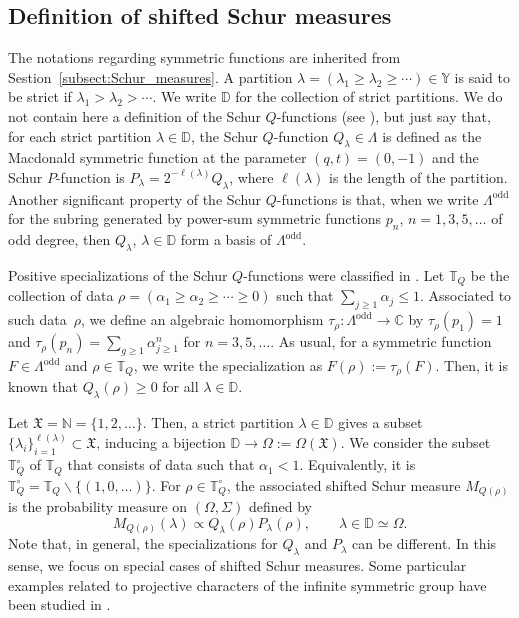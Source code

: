 \documentclass[pdftex]{sigma}
\numberwithin{equation}{section}
\newcommand{\mfrak}[1]{\mathfrak{#1}}
\newcommand{\mbb}[1]{\mathbb{#1}}
\newcommand{\mrm}[1]{\mathrm{#1}}
\begin{document}
\subsection{Definition of shifted Schur measures}
The notations regarding symmetric functions are inherited from Sestion~\ref{subsect:Schur_measures}.
A partition $\lambda=(\lambda_{1}\ge\lambda_{2}\ge\cdots)\in\mbb{Y}$ is said to be strict if $\lambda_{1}>\lambda_{2}>\cdots$.
We write $\mbb{D}$ for the collection of strict partitions. We do not contain here a definition of the Schur $Q$-functions (see \cite[Chapter~III, Section~8]{Macdonald1999}), but just say that, for each strict partition $\lambda\in \mbb{D}$, the Schur $Q$-function $Q_{\lambda}\in\Lambda$ is defined as the Macdonald symmetric function at the parameter $(q,t)=(0,-1)$ and the Schur $P$-function is $P_{\lambda}=2^{-\ell(\lambda)}Q_{\lambda}$, where $\ell(\lambda)$ is the length of the partition. Another significant property of the Schur $Q$-functions is that, when we write $\Lambda^{\mrm{odd}}$ for the subring generated by power-sum symmetric functions $p_{n}$, $n=1,3,5,\dots$ of odd degree, then $Q_{\lambda}$, $\lambda\in\mbb{D}$ form a basis of $\Lambda^{\mrm{odd}}$.

Positive specializations of the Schur $Q$-functions were classified in \cite{Ivanov1999, Nazarov1988}. Let $\mbb{T}_{Q}$ be the collection of data $\rho=(\alpha_{1}\ge \alpha_{2}\ge\cdots \ge 0)$ such that $\sum_{j\ge 1}\alpha_{j}\le 1$. Associated to such data~$\rho$, we define an algebraic homomorphism $\tau_{\rho}\colon \Lambda^{\mrm{odd}}\to\mbb{C}$ by $\tau_{\rho}(p_{1})=1$ and $\tau_{\rho}(p_{n})=\sum_{g\ge 1}\alpha_{j\ge 1}^{n}$ for $n=3,5,\dots$. As usual, for a symmetric function $F\in \Lambda^{\mrm{odd}}$ and $\rho\in \mbb{T}_{Q}$, we write the specialization as $F(\rho):=\tau_{\rho}(F)$. Then, it is known that $Q_{\lambda}(\rho)\ge 0$ for all $\lambda\in\mbb{D}$.

Let $\mfrak{X}=\mbb{N}=\{1,2,\dots\}$. Then, a strict partition $\lambda\in\mbb{D}$ gives a subset $\{\lambda_{i}\}_{i=1}^{\ell(\lambda)}\subset\mfrak{X}$, inducing a bijection $\mbb{D}\to \Omega:=\Omega(\mfrak{X})$. We consider the subset $\mbb{T}_{Q}^{\circ}$ of $\mbb{T}_{Q}$ that consists of data such that $\alpha_{1}<1$. Equivalently, it is $\mbb{T}_{Q}^{\circ}=\mbb{T}_{Q}\backslash\{(1,0,\dots)\}$.
For $\rho\in\mbb{T}_{Q}^{\circ}$, the associated shifted Schur measure $M_{Q(\rho)}$ is the probability measure on $(\Omega,\Sigma)$ defined by
\begin{equation*}
	M_{Q(\rho)}(\lambda)\propto Q_{\lambda}(\rho)P_{\lambda}(\rho),\qquad \lambda\in\mbb{D}\simeq \Omega.
\end{equation*}
Note that, in general, the specializations for $Q_{\lambda}$ and $P_{\lambda}$ can be different. In this sense, we focus on special cases of shifted Schur measures. Some particular examples related to projective characters of the infinite symmetric group have been studied in \cite{Borodin1999,Petrov2010,Petrov2011}.
\end{document}
